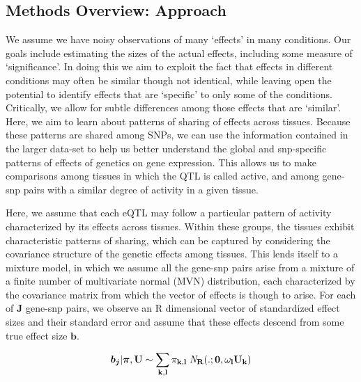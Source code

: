 \subsection{Methods Overview: Approach} 

We assume we have noisy observations of many `effects' in many  conditions. Our goals include estimating the sizes of the actual effects, including some measure of `significance'. In doing this we aim to exploit the fact that effects in different conditions may often be similar though not identical, while leaving open the potential to identify effects that are `specific' to only some of the conditions. Critically, we allow for subtle differences among those effects that are `similar'.  Here, we aim to learn about patterns of sharing of effects across tissues. Because these patterns are shared among SNPs, we can use the information contained in the larger data-set to help us better understand the global and snp-specific patterns of effects of genetics on gene expression. This allows us to make comparisons among tissues in which the QTL is called active, and among gene-snp pairs with a similar degree of activity in a given tissue. 

Here, we assume that each eQTL may follow a particular pattern of activity characterized by its effects across tissues. Within these groups, the tissues exhibit characteristic patterns of sharing, which can be captured by considering the covariance structure of the genetic effects among tissues. This lends itself to a mixture model, in which  we assume all the gene-snp pairs arise from a mixture of a finite number of multivariate normal (MVN) distribution, each characterized by the covariance matrix from which the vector of effects is though to arise. For each of $\textbf{J}$ gene-snp pairs, we observe an R dimensional vector of standardized effect sizes %
and their standard error and assume that these effects descend from some true effect size $\bm{b}$. 



 \begin{equation}
  \bm{b_{j}} | \bm{\pi},\bf{U} \sim \sum_{k,l} \pi_{k,l} \;{\it N}_R(.;\bm{0}, \omega_l U_{k})
  \label{eqn:mixprior}
\end{equation}


